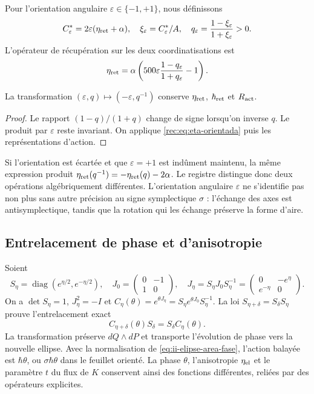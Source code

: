 Pour l’orientation angulaire \(\varepsilon\in\{-1,+1\}\), nous définissons
\[
 C^*_{\varepsilon}=2\varepsilon(\eta_{\rm ret}+\alpha),\quad
 \xi_\varepsilon=C^*_{\varepsilon}/A,\quad
 q_\varepsilon=\frac{1-\xi_\varepsilon}{1+\xi_\varepsilon}>0.
\]
L’opérateur de récupération sur les deux coordinatisations est
\begin{equation}
 \eta_{\rm ret}=\alpha\left(500\varepsilon
        \frac{1-q_\varepsilon}{1+q_\varepsilon}-1\right).
 \label{rec:eq:eta-orientada}
\end{equation}

\begin{corollary}
La transformation \((\varepsilon,q)\mapsto(-\varepsilon,q^{-1})\) conserve \(\eta_{\rm ret}\), \(\hbar_{\rm ret}\) et \(R_{\rm act}\).

\end{corollary}
\begin{proof}
Le rapport \((1-q)/(1+q)\) change de signe lorsqu’on inverse \(q\). Le produit par \(\varepsilon\) reste invariant. On applique \eqref{rec:eq:eta-orientada} puis les représentations d’action.
\end{proof}

Si l’orientation est écartée et que \(\varepsilon=+1\) est indûment maintenu, la même expression produit \(\eta_{\rm ret}(q^{-1})=-\eta_{\rm ret}(q)-2\alpha\). Le registre distingue donc deux opérations algébriquement différentes. L’orientation angulaire \(\varepsilon\) ne s’identifie pas non plus sans autre précision au signe symplectique \(\sigma\) : l’échange des axes est antisymplectique, tandis que la rotation qui les échange préserve la forme d’aire.


\subsection{Entrelacement de phase et d'anisotropie}

Soient
\[
 S_\eta=\operatorname{diag}(e^{\eta/2},e^{-\eta/2}),\quad
 J_0=\begin{pmatrix}0&-1\\1&0\end{pmatrix},\quad
 J_\eta=S_\eta J_0S_\eta^{-1}
       =\begin{pmatrix}0&-e^\eta\\e^{-\eta}&0\end{pmatrix}.
\]
On a \(\det S_\eta=1\), \(J_\eta^2=-I\) et \(C_\eta(\theta)=e^{\theta J_\eta}=S_\eta e^{\theta J_0}S_\eta^{-1}\). La loi \(S_{\eta+\delta}=S_\delta S_\eta\) prouve l'entrelacement exact
\begin{equation}
 C_{\eta+\delta}(\theta)S_\delta=S_\delta C_\eta(\theta).
 \label{rec:eq:entrelazamiento}
\end{equation}
La transformation préserve \(dQ\wedge dP\) et transporte l’évolution de phase vers la nouvelle ellipse. Avec la normalisation de \eqref{eq:ii-elipse-area-fase}, l’action balayée est \(\hbar\theta\), ou \(\sigma\hbar\theta\) dans le feuillet orienté. La phase \(\theta\), l’anisotropie \(\eta_{\rm el}\) et le paramètre \(t\) du flux de \(K\) conservent ainsi des fonctions différentes, reliées par des opérateurs explicites.
